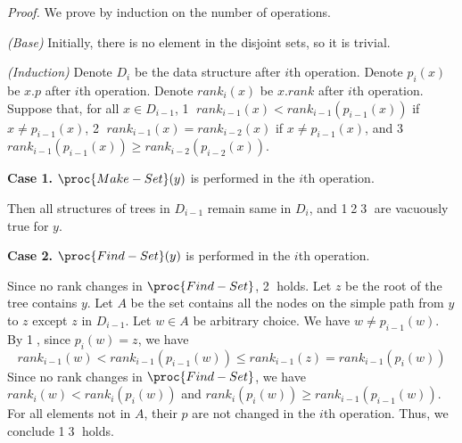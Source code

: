\begin{proof}
    We prove by induction on the number of operations.
    
    \textit{(Base)}
    Initially, there is no element in the disjoint sets,
    so it is trivial.

    \textit{(Induction)}
    Denote $D_i$ be the data structure after $i$th operation.
    Denote $p_i(x)$ be $x.p$ after $i$th operation.
    Denote $rank_i(x)$ be $x.rank$ after $i$th operation.
    Suppose that, for all $x \in D_{i - 1}$,
    \textcircled{1} $rank_{i-1}(x) < rank_{i-1}(p_{i-1}(x))$ if $x \neq p_{i-1}(x)$,
    \textcircled{2} $rank_{i-1}(x) = rank_{i-2}(x)$ if $x \neq p_{i-1}(x)$, and
    \textcircled{3} $rank_{i-1}(p_{i-1}(x)) \geq rank_{i-2}(p_{i-2}(x))$.
    
    \textbf{Case 1.}
    $\proc{Make-Set}(y)$ is performed in the $i$th operation.
    
    Then all structures of trees in $D_{i-1}$ remain same in $D_i$,
    and \textcircled{1}\textcircled{2}\textcircled{3} are vacuously true for $y$. 

    \textbf{Case 2.}
    $\proc{Find-Set}(y)$ is performed in the $i$th operation.

    Since no rank changes in $\proc{Find-Set}$, \textcircled{2} holds.
    Let $z$ be the root of the tree contains $y$.
    Let $A$ be the set contains all the nodes on the simple path 
    from $y$ to $z$ except $z$ in $D_{i-1}$.
    Let $w \in A$ be arbitrary choice.
    We have $w \neq p_{i-1}(w)$.
    By \textcircled{1}, since $p_i(w) = z$, we have 
    \begin{equation*}
        rank_{i-1}(w) < rank_{i-1}(p_{i-1}(w)) \leq rank_{i-1}(z) = rank_{i-1}(p_i(w))
    \end{equation*}
    Since no rank changes in $\proc{Find-Set}$, we have 
    $rank_i(w) < rank_i(p_i(w))$ and $rank_i(p_i(w)) \geq rank_{i-1}(p_{i-1}(w))$.
    For all elements not in $A$, their $p$ are not changed in the $i$th operation.
    Thus, we conclude \textcircled{1}\textcircled{3} holds.
     

\end{proof}
